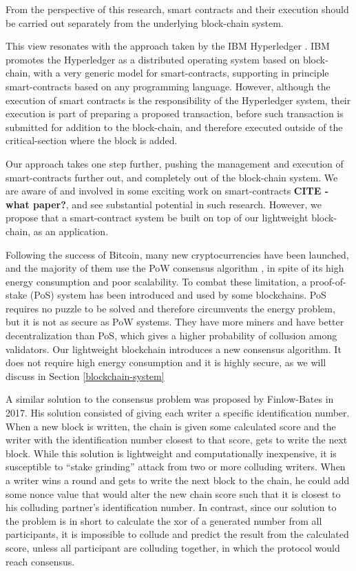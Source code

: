 \documentclass[10pt]{article}
\begin{document}
From the perspective of this research, smart contracts and their execution should be carried out separately from the underlying block-chain system. 

This view resonates with the approach taken by the IBM Hyperledger \cite{hyperledger}. IBM promotes the Hyperledger as a distributed operating system based on block-chain, with a very generic model for smart-contracts, supporting in principle smart-contracts based on any programming language. However, although the execution of smart contracts is the responsibility of the Hyperledger system, their execution is part of preparing a proposed transaction, before such transaction is submitted for addition to the block-chain, and therefore executed outside of the critical-section where the block is added.

Our approach takes one step further, pushing the management and execution of smart-contracts further out, and completely out of the block-chain system. We are aware of and involved in some exciting work on smart-contracts \textbf{CITE - what paper?}, and see substantial potential in such research. However, we propose that a smart-contract system be built on top of our lightweight block-chain, as an application.

Following the success of Bitcoin, many new cryptocurrencies have been launched, and the majority of them use the PoW consensus algorithm \cite{sadek2020blockchain}, in spite of its high energy consumption and poor scalability. To combat these limitation, a proof-of-stake (PoS) system has been introduced and used by some blockchains. PoS requires no puzzle to be solved and therefore circumvents the energy problem, but it is not as secure as PoW systems. They have more miners and have better decentralization than PoS, which gives a higher probability of collusion among validators. Our lightweight blockchain introduces a new consensus algorithm. It does not require high energy consumption and it is highly secure, as we will discuss in Section \ref{blockchain-system}

A similar solution to the consensus problem was proposed by Finlow-Bates \cite{finlow2017lightweight} in 2017. His solution consisted of giving each writer a specific identification number. When a new block is written, the chain is given some calculated score and the writer with the identification number closest to that score, gets to write the next block.
While this solution is lightweight and computationally inexpensive, it is susceptible to ``stake grinding'' \cite{onstake} attack from two or more colluding writers. When a writer wins a round and gets to write the next block to the chain, he could add some nonce value that would alter the new chain score such that it is closest to his colluding partner's identification number. 
In contrast, since our solution to the problem is in short to calculate the xor of a generated number from all participants, it is impossible to collude and predict the result from the calculated score, unless all participant are colluding together, in which the protocol would reach consensus.
\end{document}
